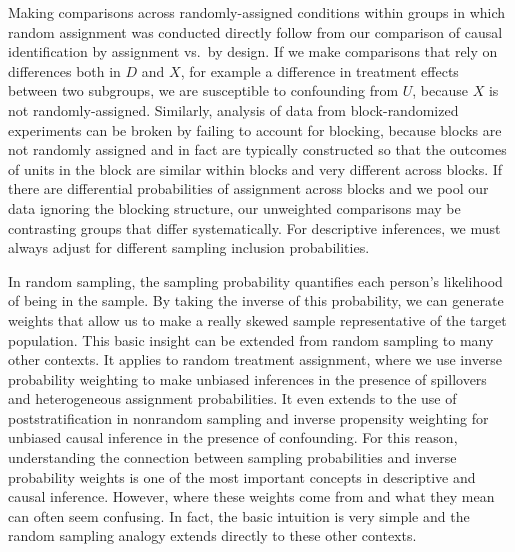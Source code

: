 \documentclass[
]{article}
\begin{document}
Making comparisons across randomly-assigned conditions within groups in
which random assignment was conducted directly follow from our
comparison of causal identification by assignment vs.~by design. If we
make comparisons that rely on differences both in \(D\) and \(X\), for
example a difference in treatment effects between two subgroups, we are
susceptible to confounding from \(U\), because \(X\) is not
randomly-assigned. Similarly, analysis of data from block-randomized
experiments can be broken by failing to account for blocking, because
blocks are not randomly assigned and in fact are typically constructed
so that the outcomes of units in the block are similar within blocks and
very different across blocks. If there are differential probabilities of
assignment across blocks and we pool our data ignoring the blocking
structure, our unweighted comparisons may be contrasting groups that
differ systematically. For descriptive inferences, we must always adjust
for different sampling inclusion probabilities.

In random sampling, the sampling probability quantifies each person's
likelihood of being in the sample. By taking the inverse of this
probability, we can generate weights that allow us to make a really
skewed sample representative of the target population. This basic
insight can be extended from random sampling to many other contexts. It
applies to random treatment assignment, where we use inverse probability
weighting to make unbiased inferences in the presence of spillovers and
heterogeneous assignment probabilities. It even extends to the use of
poststratification in nonrandom sampling and inverse propensity
weighting for unbiased causal inference in the presence of confounding.
For this reason, understanding the connection between sampling
probabilities and inverse probability weights is one of the most
important concepts in descriptive and causal inference. However, where
these weights come from and what they mean can often seem confusing. In
fact, the basic intuition is very simple and the random sampling analogy
extends directly to these other contexts.
\end{document}
